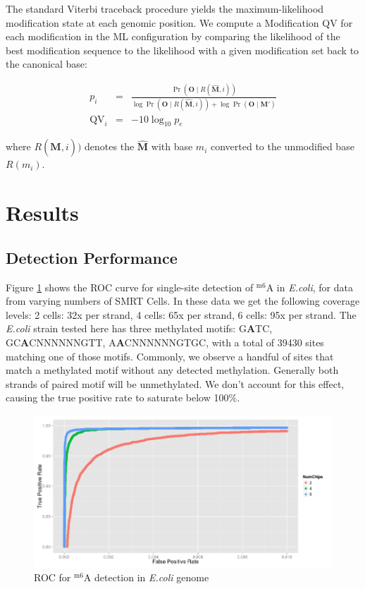 \documentclass[pdftex]{article}
\begin{document}
The standard Viterbi traceback procedure yields the maximum-likelihood modification state at each genomic position. We compute a Modification QV for each modification in the ML configuration by comparing the likelihood of the best modification sequence to the likelihood with a given modification set back to the canonical base:

\begin{eqnarray}
p_i & = & \frac{\Pr(\mathbf{O} \mid R(\hat{\mathbf{M}}, i))} {\log \Pr(\mathbf{O} \mid R(\hat{\mathbf{M}}, i)) + \log \Pr(\mathbf{O} \mid \mathbf{M}') } \\
\mathrm{QV}_i & = & -10 \log_{10} p_e
\end{eqnarray}

where $R(\hat{\mathbf{M}}, i))$ denotes the $\hat{\mathbf{M}}$ with base $m_i$ converted to the unmodified base $R(m_i)$.

\section{Results}
\subsection{Detection Performance}
Figure \ref{fig:ecoli-roc} shows the ROC curve for single-site detection of $^\textrm{m6}$A in \emph{E.coli}, for data from varying numbers of SMRT Cells. In these data we get the following coverage levels: 2 cells: 32x per strand, 4 cells: 65x per strand, 6 cells: 95x per strand. The \emph{E.coli} strain tested here has three methylated motifs: G\textbf{A}TC, GC\textbf{A}CNNNNNNGTT, A\textbf{A}CNNNNNNGTGC, with a total of 39430 sites matching one of those motifs.   Commonly, we observe a handful of sites that match a methylated motif without any detected methylation. Generally both strands of paired motif will be unmethylated.  We don't account for this effect, causing the true positive rate to saturate below 100\%.

\begin{figure}
\begin{center}\includegraphics[width=5in]{ecoli-roc.png}\end{center}
\caption{ ROC for $^\textrm{m6}$A detection in \emph{E.coli} genome }
\label{fig:ecoli-roc}
\end{figure}
\end{document}
